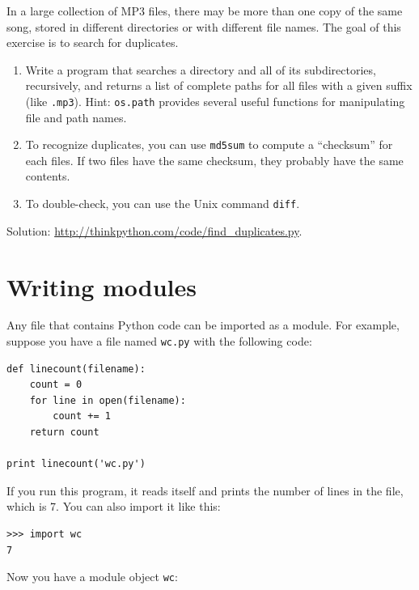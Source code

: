 \documentclass[10pt]{book}
\begin{document}
\begin{exercise}
\label{checksum}

In a large collection of MP3 files, there may be more than one
copy of the same song, stored in different directories or with
different file names.  The goal of this exercise is to search for
duplicates.

\begin{enumerate}

\item Write a program that searches a directory and all of its
subdirectories, recursively, and returns a list of complete paths
for all files with a given suffix (like {\tt .mp3}).
Hint: {\tt os.path} provides several useful functions for
manipulating file and path names.

\item To recognize duplicates, you can use {\tt md5sum}
to compute a ``checksum'' for each files.  If two files have
the same checksum, they probably have the same contents.

\item To double-check, you can use the Unix command {\tt diff}.

\end{enumerate}

Solution: \url{http://thinkpython.com/code/find_duplicates.py}.

\end{exercise}


\section{Writing modules}
\label{modules}

Any file that contains Python code can be imported as a module.
For example, suppose you have a file named {\tt wc.py} with the following
code:

\begin{verbatim}
def linecount(filename):
    count = 0
    for line in open(filename):
        count += 1
    return count

print linecount('wc.py')
\end{verbatim}
%
If you run this program, it reads itself and prints the number
of lines in the file, which is 7.
You can also import it like this:

\begin{verbatim}
>>> import wc
7
\end{verbatim}
%
Now you have a module object {\tt wc}:
\end{document}

